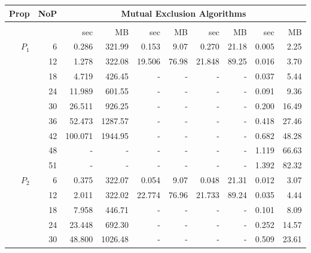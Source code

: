 \begin{figure}[h!]\scriptsize
	\centering
	\setlength{\tabcolsep}{2pt}
	\begin{tabular}{| r | r | r | r | r | r | r | r | r | r |}
		\hline
		\textbf{Prop} & \textbf{NoP} & \multicolumn{8}{c|}{Mutual Exclusion Algorithms} \\
		\hline
		{} & {} & \multicolumn{2}{c|}{\verds{}} & \multicolumn{2}{c|}{\nusmv{}} & \multicolumn{2}{c|}{\nuxmv{}} &  \multicolumn{2}{c|}{\sctl{}} \\
		\hline
		{} & {} & sec & MB & sec & MB & sec & MB &  sec & MB \\
		\hline
		\multirow{6}{*}{$P_1$} & 6 & 0.286 & 321.99 & 0.153 & 9.07 & 0.270 & 21.18 & 0.005 & 2.25 \\
		{} & 12 & 1.278 & 322.08 & 19.506 & 76.98 & 21.848 & 89.25 & 0.016 & 3.70  \\
		{} & 18 & 4.719 & 426.45 & - & - & - & - & 0.037 & 5.44  \\
		{} & 24 & 11.989 & 601.55 & - & - & - & - & 0.091 & 9.36  \\
		{} & 30 & 26.511 & 926.25 & - & - & - & - & 0.200 & 16.49  \\
		{} & 36 & 52.473 & 1287.57 & - & - & - & - & 0.418 & 27.46  \\
		{} & 42 & 100.071 & 1944.95 & - & - & - & - & 0.682 & 48.28  \\
		{} & 48 & - & - & - & - & - & - & 1.119 & 66.63  \\
		{} & 51 & - & - & - & - & - & - & 1.392 & 82.32  \\
		\hline
		\multirow{6}{*}{$P_2$} & 6 & 0.375 & 322.07 & 0.054 & 9.07 & 0.048 & 21.31 & 0.012 & 3.07  \\
		{} & 12 & 2.011 & 322.02 & 22.774 & 76.96 & 21.733 & 89.24 & 0.035 & 4.44  \\
		{} & 18 & 7.958 & 446.71 & - & - & - & - & 0.101 & 8.09  \\
		{} & 24 & 23.448 & 692.30 & - & - & - & - & 0.252 & 14.57  \\
		{} & 30 & 48.800 & 1026.48 & - & - & - & - & 0.509 & 23.61  \\

\end{tabular}
\end{figure}

